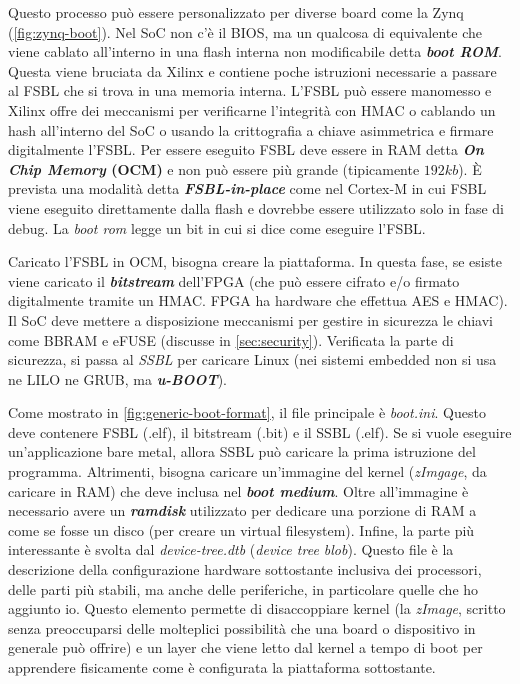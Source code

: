\documentclass{article}
\begin{document}
Questo processo può essere personalizzato per diverse board come la Zynq (\cref{fig:zynq-boot}). Nel SoC non c'è il BIOS, ma un qualcosa di equivalente che viene cablato all'interno in una flash interna non modificabile detta \textbf{\textit{boot ROM}}. Questa viene bruciata da Xilinx e contiene poche istruzioni necessarie a passare al FSBL che si trova in una memoria interna. L'FSBL può essere manomesso e Xilinx offre dei meccanismi per verificarne l'integrità con HMAC o cablando un hash all'interno del SoC o usando la crittografia a chiave asimmetrica e firmare digitalmente l'FSBL. Per essere eseguito FSBL deve essere in RAM detta \textbf{\textit{On Chip Memory} (OCM)} e non può essere più grande (tipicamente $192kb$). È prevista una modalità detta \textbf{\textit{FSBL-in-place}} come nel Cortex-M in cui FSBL viene eseguito direttamente dalla flash e dovrebbe essere utilizzato solo in fase di debug. La \textit{boot rom} legge un bit in cui si dice come eseguire l'FSBL.

Caricato l'FSBL in OCM, bisogna creare la piattaforma. In questa fase, se esiste viene caricato il \textbf{\textit{bitstream}} dell'FPGA (che può essere cifrato e/o firmato digitalmente tramite un HMAC. FPGA ha hardware che effettua AES e HMAC). Il SoC deve mettere a disposizione meccanismi per gestire in sicurezza le chiavi come BBRAM e eFUSE (discusse in \cref{sec:security}). Verificata la parte di sicurezza, si passa al \textit{SSBL} per caricare Linux (nei sistemi embedded non si usa ne LILO ne GRUB, ma \textbf{\textit{u-BOOT}}).

Come mostrato in \cref{fig:generic-boot-format}, il file principale è \textit{boot.ini}. Questo deve contenere FSBL (.elf), il bitstream (.bit) e il SSBL (.elf). Se si vuole eseguire un'applicazione bare metal, allora SSBL può caricare la prima istruzione del programma. Altrimenti, bisogna caricare un'immagine del kernel (\textit{zImgage}, da caricare in RAM) che deve inclusa nel \textbf{\textit{boot medium}}. Oltre all'immagine è necessario avere un \textbf{\textit{ramdisk}} utilizzato per dedicare una porzione di RAM a come se fosse un disco (per creare un virtual filesystem). Infine, la parte più interessante è svolta dal \textit{device-tree.dtb} (\textit{device tree blob}). Questo file è la descrizione della configurazione hardware sottostante inclusiva dei processori, delle parti più stabili, ma anche delle periferiche, in particolare quelle che ho aggiunto io. Questo elemento permette di disaccoppiare kernel (la \textit{zImage}, scritto senza preoccuparsi delle molteplici possibilità che una board o dispositivo in generale può offrire) e un layer che viene letto dal kernel a tempo di boot per apprendere fisicamente come è configurata la piattaforma sottostante.
\end{document}
